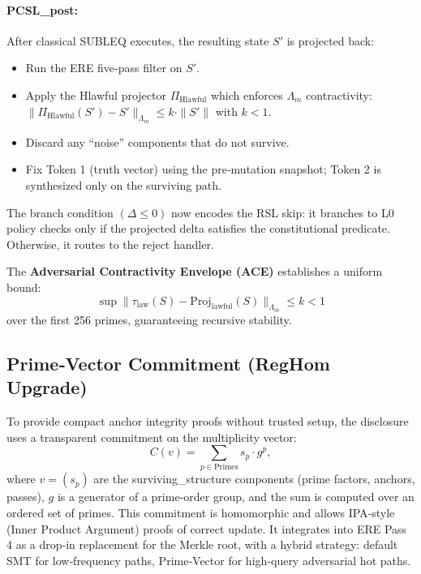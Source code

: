 \documentclass[11pt,a4paper]{article}
\theoremstyle{definition}
\theoremstyle{remark}
\begin{document}
\paragraph{PCSL\_post:} After classical SUBLEQ executes, the resulting state $S'$ is projected back:
\begin{itemize}[noitemsep]
    \item Run the ERE five‑pass filter on $S'$.
    \item Apply the Hlawful projector $\Pi_{\text{Hlawful}}$ which enforces $\Lambda_m$ contractivity: $\|\Pi_{\text{Hlawful}}(S') - S'\|_{\Lambda_m} \le k \cdot \|S'\|$ with $k<1$.
    \item Discard any “noise” components that do not survive.
    \item Fix Token 1 (truth vector) using the pre‑mutation snapshot; Token 2 is synthesized only on the surviving path.
\end{itemize}
The branch condition $(\Delta \le 0)$ now encodes the RSL skip: it branches to L0 policy checks only if the projected delta satisfies the constitutional predicate. Otherwise, it routes to the reject handler.

The \textbf{Adversarial Contractivity Envelope (ACE)} establishes a uniform bound:
\[
\sup \|\tau_\text{law}(S) - \text{Proj}_\text{lawful}(S)\|_{\Lambda_m} \le k < 1
\]
over the first 256 primes, guaranteeing recursive stability.

\subsection{Prime‑Vector Commitment (RegHom Upgrade)}
\label{subsec:primevector}
To provide compact anchor integrity proofs without trusted setup, the disclosure uses a transparent commitment on the multiplicity vector:
\begin{equation}
C(v) = \sum_{p \in \text{Primes}} s_p \cdot g^{p},
\end{equation}
where $v = (s_p)$ are the surviving\_structure components (prime factors, anchors, passes), $g$ is a generator of a prime‑order group, and the sum is computed over an ordered set of primes. This commitment is homomorphic and allows IPA‑style (Inner Product Argument) proofs of correct update. It integrates into ERE Pass 4 as a drop‑in replacement for the Merkle root, with a hybrid strategy: default SMT for low‑frequency paths, Prime‑Vector for high‑query adversarial hot paths.
\end{document}
